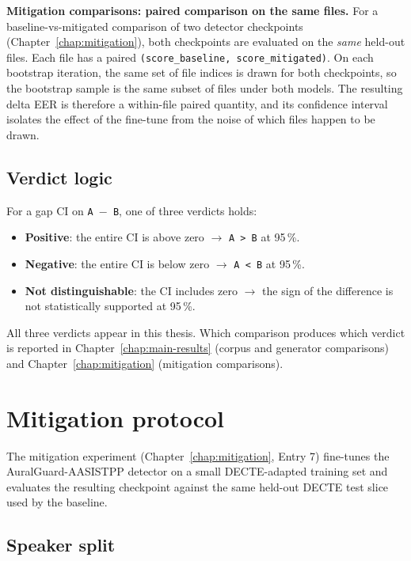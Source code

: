 \textbf{Mitigation comparisons: paired comparison on the same
files.} For a baseline-vs-mitigated comparison of two detector
checkpoints (Chapter~\ref{chap:mitigation}), both checkpoints are
evaluated on the \emph{same} held-out files. Each file has a paired
\texttt{(score\_baseline, score\_mitigated)}. On each bootstrap
iteration, the same set of file indices is drawn for both
checkpoints, so the bootstrap sample is the same subset of files
under both models. The resulting delta EER is therefore a
within-file paired quantity, and its confidence interval isolates
the effect of the fine-tune from the noise of which files happen
to be drawn.

\subsection{Verdict logic}
\label{sec:methodology-bootstrap-verdict}

For a gap CI on \texttt{A $-$ B}, one of three verdicts holds:

\begin{itemize}
    \item \textbf{Positive}: the entire CI is above zero $\rightarrow$ \texttt{A > B} at 95\,\%.
    \item \textbf{Negative}: the entire CI is below zero $\rightarrow$ \texttt{A < B} at 95\,\%.
    \item \textbf{Not distinguishable}: the CI includes zero $\rightarrow$ the sign of the
        difference is not statistically supported at 95\,\%.
\end{itemize}

All three verdicts appear in this thesis. Which comparison produces
which verdict is reported in Chapter~\ref{chap:main-results} (corpus
and generator comparisons) and Chapter~\ref{chap:mitigation}
(mitigation comparisons).


\section{Mitigation protocol}
\label{sec:methodology-mitigation}

The mitigation experiment (Chapter~\ref{chap:mitigation}, Entry 7)
fine-tunes the AuralGuard-AASISTPP detector on a small
DECTE-adapted training set and evaluates the resulting checkpoint
against the same held-out DECTE test slice used by the baseline.

\subsection{Speaker split}
\label{sec:methodology-mitigation-split}

